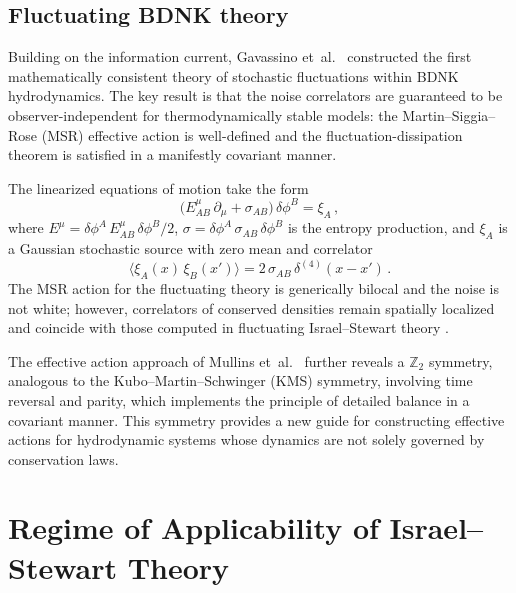 \subsection{Fluctuating BDNK theory}

Building on the information current, Gavassino et~al.\
\citep{GavassinoBDNKFluctuations2024} constructed the first
mathematically consistent theory of stochastic fluctuations within
BDNK hydrodynamics.  The key result is that the noise correlators
are guaranteed to be observer-independent for thermodynamically
stable models: the Martin--Siggia--Rose (MSR) effective action is
well-defined and the fluctuation-dissipation theorem is satisfied in a
manifestly covariant manner.

The linearized equations of motion take the form
\begin{equation}
  \bigl(E_{AB}^{\mu}\,\partial_{\mu} + \sigma_{AB}\bigr)\,\delta\phi^{B}
  = \xi_{A}\,,
  \label{eq:fluctuating-eom}
\end{equation}
where $E^{\mu} = \delta\phi^{A}\,E_{AB}^{\mu}\,\delta\phi^{B}/2$,
$\sigma = \delta\phi^{A}\,\sigma_{AB}\,\delta\phi^{B}$ is the entropy
production, and $\xi_{A}$ is a Gaussian stochastic source with zero
mean and correlator
\begin{equation}
  \langle\xi_{A}(x)\,\xi_{B}(x')\rangle
  = 2\,\sigma_{AB}\,\delta^{(4)}(x - x')\,.
  \label{eq:noise-correlator}
\end{equation}
The MSR action for the fluctuating theory is generically bilocal and
the noise is not white; however, correlators of conserved densities
remain spatially localized and coincide with those computed in
fluctuating Israel--Stewart theory
\citep{GavassinoBDNKFluctuations2024,MullinsHippertGavassinoNoronha2024}.

The effective action approach of Mullins et~al.\
\citep{MullinsHippertGavassinoNoronha2024,MullinsGavassinoStochastic2024}
further reveals a $\mathbb{Z}_{2}$ symmetry, analogous to the
Kubo--Martin--Schwinger (KMS) symmetry, involving time reversal and
parity, which implements the principle of detailed balance in a
covariant manner.  This symmetry provides a new guide for constructing
effective actions for hydrodynamic systems whose dynamics are not solely
governed by conservation laws.


\section{Regime of Applicability of Israel--Stewart Theory}
\label{sec:rel-regime-IS}

